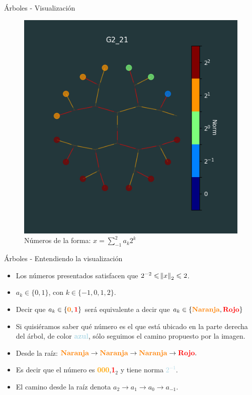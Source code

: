 \documentclass{beamer}
\theoremstyle{definition}
\numberwithin{equation}{section}
\renewcommand{\leq}{\leqslant}
\begin{document}
\begin{frame}[fragile]{Árboles - Visualización}
	\begin{figure}
		\caption{Números de la forma: $x=\sum_{-1}^{2}a_k2^k$}
		\includegraphics[scale=0.6]{tree_images/G2_21_dark.png}
	\end{figure}

\end{frame}

\begin{frame}[fragile]{Árboles - Entendiendo la visualización}
	\begin{itemize}
		\item Los números presentados satisfacen que $2^{-2}\leq\norm{x}_2\leq 2$.
		\item $a_k\in\{0,1\}$, con $k\in\{-1,0,1,2\}$.
		\item Decir que $a_k\in\{\textbf{\textcolor{orange}{0}},\textbf{\textcolor{red}{1}}\}$ será equivalente a decir que $a_k\in\{\textbf{\textcolor{orange}{Naranja}},\textbf{\textcolor{red}{Rojo}}\}$
		\item Si quisiéramos saber qué número es el que está ubicado en la parte derecha del árbol, de color \textbf{\textcolor{lightBlue}{azul}}, sólo seguimos el camino propuesto por la imagen.
		\item Desde la raíz: $\textbf{\textcolor{orange}{Naranja}}\to\textbf{\textcolor{orange}{Naranja}}\to\textbf{\textcolor{orange}{Naranja}}\to\textbf{\textcolor{red}{Rojo}}.$
		\item Es decir que el número es \textbf{\textcolor{orange}{000}},\textbf{\textcolor{red}{1}}$_2$ y tiene norma \textbf{\textcolor{lightBlue}{$2^{-1}$}}.
		\item El camino desde la raíz denota $a_2\to a_1\to a_0\to a_{-1}$.
	\end{itemize}

	
\end{frame}
\end{document}
